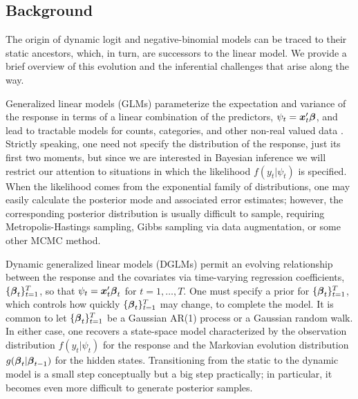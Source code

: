 \subsection{Background}

\npoint The origin of dynamic logit and negative-binomial models can be traced
to their static ancestors, which, in turn, are successors to the linear model.
We provide a brief overview of this evolution and the inferential challenges
that arise along the way.

\npoint Generalized linear models (GLMs) 
parameterize the expectation and variance of the response in terms of a linear
combination of the predictors, $\psi_t = \boldsymbol{x}_t' \boldsymbol{\beta}$, and lead to tractable
models for counts, categories, and other non-real valued data
\citep{wedderburn-1974, mccullagh-nelder-1989}.  Strictly speaking, one need not
specify the distribution of the response, just its first two moments, but since
we are interested in Bayesian inference we will restrict our attention to
situations in which the likelihood $f(y_t | \psi_t)$ is specified.  When the
likelihood comes from the exponential family of distributions, one may easily
calculate the posterior mode and associated error estimates; however, the
corresponding posterior distribution is usually difficult to sample, requiring
Metropolis-Hastings sampling, Gibbs sampling via data augmentation, or some
other MCMC method.

\npoint Dynamic generalized linear models (DGLMs) permit an evolving
relationship between the response and the covariates via time-varying regression
coefficients, $\{\boldsymbol{\beta}_t\}_{t=1}^T$, so that $\psi_t = \boldsymbol{x}_t' \boldsymbol{\beta}_t$ for
$t=1, \ldots, T$.  One must specify a prior for $\{\boldsymbol{\beta}_t\}_{t=1}^T$, which
controls how quickly $\{\boldsymbol{\beta}_t\}_{t=1}^T$ may change, to complete the model.
It is common to let $\{\boldsymbol{\beta}_t\}_{t=1}^T$ be a Gaussian AR(1) process or a
Gaussian random walk.  In either case, one recovers a state-space model
characterized by the observation distribution $f(y_t | \psi_t)$ for the response
and the Markovian evolution distribution $g(\boldsymbol{\beta}_t | \boldsymbol{\beta}_{t-1})$ for the
hidden states.  Transitioning from the static to the dynamic model is a small
step conceptually but a big step practically; in particular, it becomes even
more difficult to generate posterior samples.

